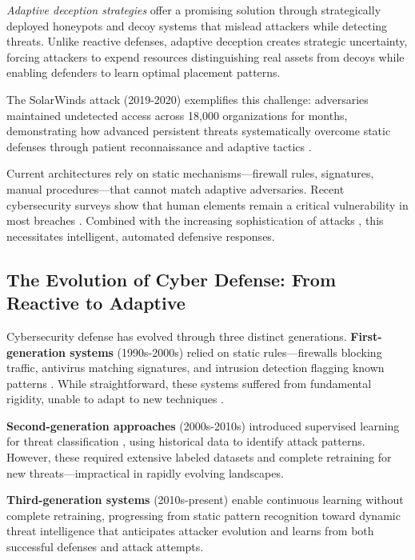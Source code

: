 \documentclass[12pt,oneside]{article}
\begin{document}
\textit{Adaptive deception strategies} offer a promising solution through strategically deployed honeypots and decoy systems that mislead attackers while detecting threats. Unlike reactive defenses, adaptive deception creates strategic uncertainty, forcing attackers to expend resources distinguishing real assets from decoys while enabling defenders to learn optimal placement patterns.

The SolarWinds attack (2019-2020) exemplifies this challenge: adversaries maintained undetected access across 18,000 organizations for months, demonstrating how advanced persistent threats systematically overcome static defenses through patient reconnaissance and adaptive tactics \cite{alpcan2010network,sommer2010outside}. 

Current architectures rely on static mechanisms—firewall rules, signatures, manual procedures—that cannot match adaptive adversaries. Recent cybersecurity surveys show that human elements remain a critical vulnerability in most breaches \cite{apruzzese2022deep}. Combined with the increasing sophistication of attacks \cite{zhang2020adversarial}, this necessitates intelligent, automated defensive responses.


\subsection{The Evolution of Cyber Defense: From Reactive to Adaptive}

Cybersecurity defense has evolved through three distinct generations. \textbf{First-generation systems} (1990s-2000s) relied on static rules—firewalls blocking traffic, antivirus matching signatures, and intrusion detection flagging known patterns \cite{alpcan2010network}. While straightforward, these systems suffered from fundamental rigidity, unable to adapt to new techniques \cite{sommer2010outside}.

\textbf{Second-generation approaches} (2000s-2010s) introduced supervised learning for threat classification \cite{sommer2010outside}, using historical data to identify attack patterns. However, these required extensive labeled datasets and complete retraining for new threats—impractical in rapidly evolving landscapes.

\textbf{Third-generation systems} (2010s-present) enable continuous learning without complete retraining, progressing from static pattern recognition toward dynamic threat intelligence that anticipates attacker evolution and learns from both successful defenses and attack attempts.
\end{document}
